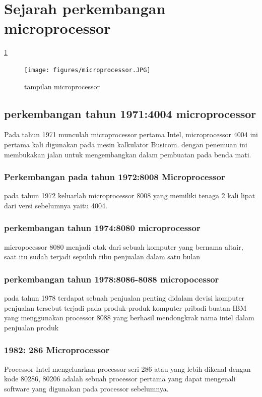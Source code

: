  \section{Sejarah perkembangan microprocessor}
 	\ref{microprocessor}


 	\begin{figure}[ht]
\centerline{\texttt{[image: figures/microprocessor.JPG]}}
\caption{tampilan microprocessor}
\label{microprocessor}
\end{figure}
 			\subsection{perkembangan tahun 1971:4004 microprocessor}
 	Pada tahun 1971 munculah microprocessor pertama Intel, microprocessor 4004 ini pertama kali digunakan pada mesin kalkulator Busicom. dengan penemuan ini membukakan jalan untuk mengembangkan dalam pembuatan pada benda mati.
 			\subsubsection{Perkembangan pada tahun 1972:8008 Microprocessor}
 	pada tahun 1972 keluarlah microprocessor 8008 yang memiliki tenaga 2 kali lipat dari versi sebelumnya yaitu 4004.

 	
 			\subsubsection{perkembangan tahun 1974:8080 microprocessor}
 	micropocessor 8080 menjadi otak dari sebuah komputer yang bernama altair, saat itu sudah terjadi sepuluh ribu penjualan dalam satu bulan
 			\subsubsection{perkembangan tahun 1978:8086-8088 micropocessor}
 	pada tahun 1978 terdapat sebuah penjualan penting didalam devisi komputer penjualan tersebut terjadi pada produk-produk komputer pribadi buatan IBM yang menggunakan processor 8088 yang berhasil mendongkrak nama intel dalam penjualan produk


 			\subsubsection{1982: 286 Microprocessor}
 	Processor Intel mengeluarkan processor seri 286 atau yang lebih dikenal dengan kode 80286, 80206 adalah sebuah processor pertama yang dapat mengenali software yang digunakan pada processor sebelumnya.
